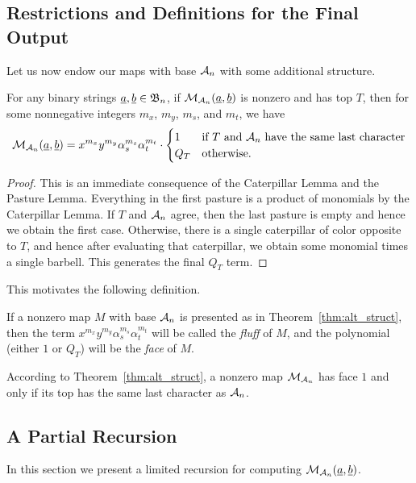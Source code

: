 \subsection{Restrictions and Definitions for the Final Output}
Let us now endow our maps with base $\AA_n$ with some additional structure.
\begin{theorem}
	For any binary strings $\ul a, \ul b \in \BB_n$, if $\MM_{\AA_n} (\ul a, \ul b)$ is nonzero and has top $T$, then for some nonnegative integers $m_x$, $m_y$, $m_s$, and $m_t$, we have 
	\[
		\MM_{\AA_n} (\ul a, \ul b) =
		x^{m_x}y^{m_y}\alpha_s^{m_s}\alpha_t^{m_t} \cdot
		\begin{cases}
			1 & \text{if $T$ and $\AA_n$ have the same last character} \\
			Q_T & \text{otherwise}.
		\end{cases}
	\]
	\label{thm:alt_struct}
\end{theorem}
\begin{proof}
	This is an immediate consequence of the Caterpillar Lemma and the Pasture Lemma.  Everything in the first pasture is a product of monomials by the Caterpillar Lemma.  If $T$ and $\AA_n$ agree, then the last pasture is empty and hence we obtain the first case.  Otherwise, there is a single caterpillar of color opposite to $T$, and hence after evaluating that caterpillar, we obtain some monomial times a single barbell.  This generates the final $Q_T$ term.
\end{proof}

This motivates the following definition.
\begin{definition*}
	If a nonzero map $M$ with base $\AA_n$ is presented as in Theorem~\ref{thm:alt_struct}, then the term $x^{m_x}y^{m_y}\alpha_s^{m_s}\alpha_t^{m_t}$ will be called the \emph{fluff} of $M$, and the polynomial (either $1$ or $Q_T$) will be the \emph{face} of $M$. 
\end{definition*}
\begin{remark*}
	According to Theorem~\ref{thm:alt_struct}, a nonzero map $\MM_{\AA_n}$ has face $1$ and only if its top has the same last character as $\AA_n$.
\end{remark*}

\subsection{A Partial Recursion}
In this section we present a limited recursion for computing $\MM_{\AA_n}(\ul a, \ul b)$.  

